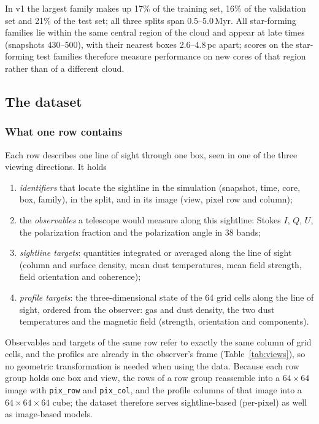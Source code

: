 In v1 the largest family makes up 17\% of the training set, 16\% of the validation set and 21\% of the test
set; all three splits span 0.5--5.0\,Myr. All star-forming families lie within the same central region of the
cloud and appear at late times (snapshots 430--500), with their nearest boxes 2.6--4.8\,pc apart; scores on the
star-forming test families therefore measure performance on new cores of that region rather than of a different
cloud.

\subsection{The dataset}
\label{sec:dataset:contents}

\subsubsection{What one row contains}

Each row describes one line of sight through one box, seen in one of the three viewing directions. It holds
\begin{enumerate}
  \item \emph{identifiers} that locate the sightline in the simulation (snapshot, time, core, box, family), in the
  split, and in its image (view, pixel row and column);
  \item the \emph{observables} a telescope would measure along this sightline: Stokes $I$, $Q$, $U$, the
  polarization fraction and the polarization angle in 38 bands;
  \item \emph{sightline targets}: quantities integrated or averaged along the line of sight (column and surface
  density, mean dust temperatures, mean field strength, field orientation and coherence);
  \item \emph{profile targets}: the three-dimensional state of the 64 grid cells along the line of sight, ordered
  from the observer: gas and dust density, the two dust temperatures and the magnetic field (strength, orientation
  and components).
\end{enumerate}
Observables and targets of the same row refer to exactly the same column of grid cells, and the profiles are
already in the observer's frame (Table~\ref{tab:views}), so no geometric transformation is needed when using the
data. Because each row group holds one box and view, the rows of a row group reassemble into a $64\times64$ image
with \texttt{pix\_row} and \texttt{pix\_col}, and the profile columns of that image into a $64\times64\times64$
cube; the dataset therefore serves sightline-based (per-pixel) as well as image-based models.

